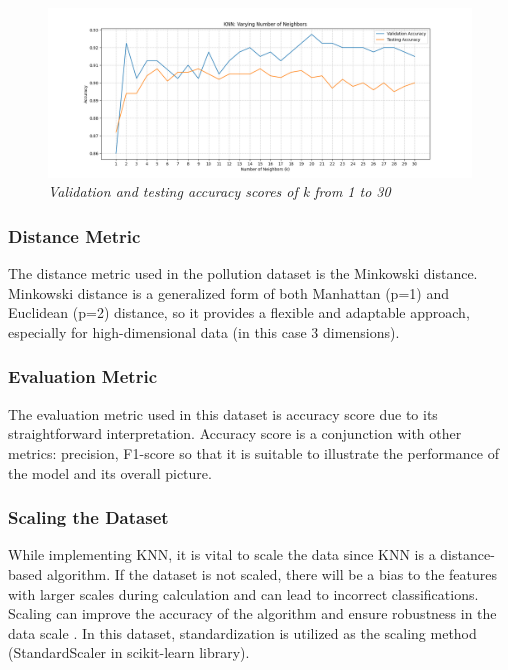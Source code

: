 \documentclass[10pt,twocolumn]{article}
\begin{document}
\begin{figure}[h!]
    \centering
    \includegraphics[width=\textwidth]{1to30.png}
    \caption{\textit{Validation and testing accuracy scores of k from 1 to 30}}
    \label{fig:Varies_k}
\end{figure}

\subsubsection{Distance Metric}
The distance metric used in the pollution dataset is the Minkowski distance. Minkowski distance is a generalized form of both Manhattan (p=1) and Euclidean (p=2) distance, so it provides a flexible and adaptable approach, especially for high-dimensional data (in this case 3 dimensions). \cite{halder2024}

\subsubsection{Evaluation Metric}
The evaluation metric used in this dataset is accuracy score due to its straightforward interpretation. Accuracy score is a conjunction with other metrics: precision, F1-score so that it is suitable to illustrate the performance of the model and its overall picture. \cite{herath2024}

\subsubsection{Scaling the Dataset}
While implementing KNN, it is vital to scale the data since KNN is a distance-based algorithm. If the dataset is not scaled, there will be a bias to the features with larger scales during calculation and can lead to incorrect classifications. Scaling can improve the accuracy of the algorithm and ensure robustness in the data scale \cite{laviale2023}. In this dataset, standardization is utilized as the scaling method (StandardScaler in scikit-learn library).
\end{document}
